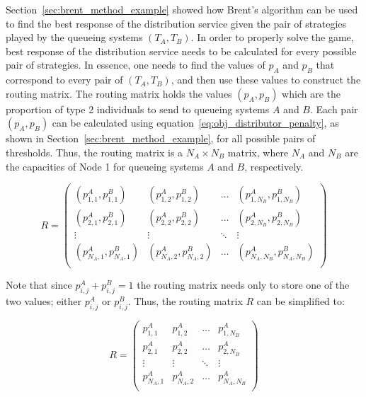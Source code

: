 Section~\ref{sec:brent_method_example} showed how Brent's algorithm can be used
to find the best response of the distribution service given the pair of
strategies played by the queueing systems \((T_A, T_B)\).
In order to properly solve the game, best response of the distribution service
needs to be calculated for every possible pair of strategies.
In essence, one needs to find the values of \(p_A\) and \(p_B\) that correspond
to every pair of \((T_A, T_B)\), and then use these values to construct the
routing matrix.
The routing matrix holds the values \((p_A, p_B)\) which are the proportion
of type 2 individuals to send to queueing systems \(A\) and \(B\).
Each pair \((p_A, p_B)\) can be calculated using
equation~\eqref{eq:obj_distributor_penalty}, as shown in
Section~\ref{sec:brent_method_example}, for all possible pairs of thresholds.
Thus, the routing matrix is a \(N_A \times N_B\) matrix, where \(N_A\) and
\(N_B\) are the capacities of Node 1 for queueing systems \(A\) and \(B\),
respectively.

\begin{equation}\label{eq:routing_matrix}
    R =
    \begin{pmatrix}
        (p_{1,1}^A, p_{1,1}^B) & (p_{1,2}^A, p_{1,2}^B) & \dots &
        (p_{1,N_B}^A, p_{1,N_B}^B) \\
        (p_{2,1}^A, p_{2,1}^B) & (p_{2,2}^A, p_{2,2}^B) & \dots &
        (p_{2,N_B}^A, p_{2,N_B}^B) \\
        \vdots & \vdots & \ddots & \vdots \\
        (p_{N_A,1}^A, p_{N_A,1}^B) & (p_{N_A,2}^A, p_{N_A,2}^B) & \dots &
        (p_{N_A,N_B}^A, p_{N_A,N_B}^B) \\
    \end{pmatrix}
\end{equation}

Note that since \(p_{i,j}^A + p_{i,j}^B = 1\) the routing matrix needs only to
store one of the two values; either \(p_{i,j}^A\) or \(p_{i,j}^B\).
Thus, the routing matrix \(R\) can be simplified to:

\begin{equation}\label{eq:routing_matrix_simplified}
    R =
    \begin{pmatrix}
        p_{1,1}^A & p_{1,2}^A & \dots & p_{1,N_B}^A \\
        p_{2,1}^A & p_{2,2}^A & \dots & p_{2,N_B}^A \\
        \vdots & \vdots & \ddots & \vdots \\
        p_{N_A,1}^A & p_{N_A,2}^A & \dots & p_{N_A,N_B}^A \\
    \end{pmatrix}
\end{equation}



